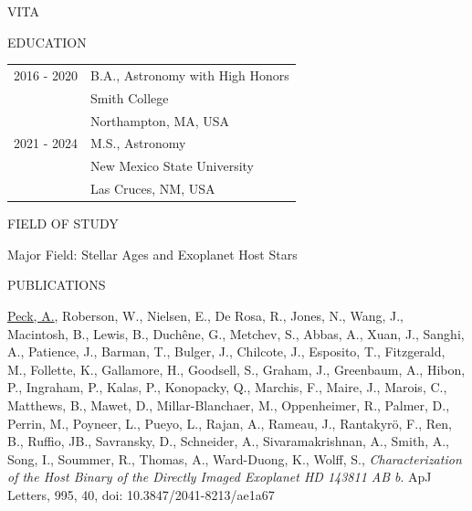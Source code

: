 \begin{center}
 VITA
\end{center}

\medskip

\begin{center}
EDUCATION
\end{center}


\begin{flushleft}
\begin{tabular}{ll}
 
2016 - 2020 &  B.A., Astronomy with High Honors \\
 & Smith College \\
 & Northampton, MA, USA \\
 
 2021 - 2024&  M.S., Astronomy  \\
 & New Mexico State University \\
 & Las Cruces, NM, USA
\end{tabular}
\end{flushleft}

\medskip

\singlespace

\medskip

\begin{center}
FIELD OF STUDY
\end{center}
\begin{flushleft}
Major Field: Stellar Ages and Exoplanet Host Stars
\end{flushleft}

\begin{center}
PUBLICATIONS %
\end{center}

\hangindent=0.5in \noindent \underline{Peck, A.}, Roberson, W., Nielsen, E., De Rosa, R., Jones, N., Wang, J., Macintosh, B., Lewis, B., Duchêne, G., Metchev, S., Abbas, A., Xuan, J., Sanghi, A., Patience, J., Barman, T., Bulger, J., Chilcote, J., Esposito, T., Fitzgerald, M., Follette, K., Gallamore, H., Goodsell, S., Graham, J., Greenbaum, A., Hibon, P., Ingraham, P., Kalas, P., Konopacky, Q., Marchis, F., Maire, J., Marois, C., Matthews, B., Mawet, D., Millar-Blanchaer, M., Oppenheimer, R., Palmer, D., Perrin, M., Poyneer, L., Pueyo, L., Rajan, A., Rameau, J., Rantakyrö, F., Ren, B., Ruffio, JB., Savransky, D., Schneider, A., Sivaramakrishnan, A., Smith, A., Song, I., Soummer, R., Thomas, A., Ward-Duong, K., Wolff, S., \textit{Characterization of the Host Binary of the Directly Imaged Exoplanet HD 143811 AB b}. ApJ Letters, 995, 40, doi: 10.3847/2041-8213/ae1a67



